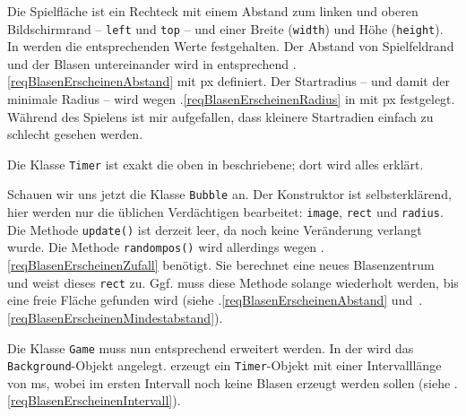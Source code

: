 Die Spielfläche ist ein Rechteck mit einem Abstand zum linken und oberen Bildschirmrand -- \texttt{left} und \texttt{top} -- und einer Breite (\texttt{width}) und Höhe (\texttt{height}). In  werden die entsprechenden Werte festgehalten. Der Abstand von Spielfeldrand und der Blasen untereinander wird in  entsprechend .\ref{reqBlasenErscheinenAbstand} mit \unit[10]{px} definiert. Der Startradius -- und damit der minimale Radius -- wird wegen .\ref{reqBlasenErscheinenRadius} in  mit \unit[15]{px} festgelegt. Während des Spielens ist mir aufgefallen, dass kleinere Startradien einfach zu schlecht gesehen werden.


Die Klasse \texttt{Timer} ist exakt die oben in  beschriebene; dort wird alles erklärt.


Schauen wir uns jetzt die Klasse \texttt{Bubble} an. Der Konstruktor ist selbsterklärend, hier werden nur die üblichen Verdächtigen bearbeitet: \texttt{image}, \texttt{rect} und \texttt{radius}. Die Methode \texttt{update()} ist derzeit leer, da noch keine Veränderung verlangt wurde. Die Methode \texttt{randompos()} wird allerdings wegen .\ref{reqBlasenErscheinenZufall} benötigt. Sie berechnet eine neues Blasenzentrum und weist dieses \texttt{rect} zu. Ggf. muss diese Methode solange wiederholt werden, bis eine freie Fläche gefunden wird (siehe .\ref{reqBlasenErscheinenAbstand} und~.\ref{reqBlasenErscheinenMindestabstand}).


Die Klasse \texttt{Game} muss nun entsprechend erweitert werden. In der  wird das \texttt{Background}-Objekt angelegt.  erzeugt ein \texttt{Timer}-Objekt mit einer Intervalllänge von \unit[500]{ms}, wobei im ersten Intervall noch keine Blasen erzeugt werden sollen (siehe .\ref{reqBlasenErscheinenIntervall}).


